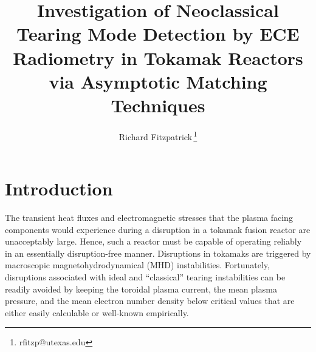 \documentclass[12pt,prb,aps]{revtex4-1}
\begin{document}
\title{Investigation of Neoclassical Tearing Mode Detection by ECE Radiometry in  Tokamak Reactors via Asymptotic Matching Techniques}
\author{Richard Fitzpatrick\,\footnote{rfitzp@utexas.edu}}

\begin{abstract}
\end{abstract}
\maketitle

\section{Introduction}
The transient heat fluxes and electromagnetic stresses that the plasma facing components would experience during a disruption in
a tokamak fusion reactor are unacceptably large.\cite{iter,wesson}  Hence, such a reactor must be capable of  operating reliably in an essentially disruption-free manner. 
Disruptions in tokamaks are triggered by macroscopic magnetohydrodynamical (MHD) instabilities.\cite{jet} Fortunately, disruptions associated with ideal   and
``classical'' tearing instabilities can   be readily avoided  by keeping the toroidal plasma current, the  mean plasma pressure, and
the mean electron number density below  critical values that are either easily calculable or well-known empirically.\cite{iter}  
\end{document}

